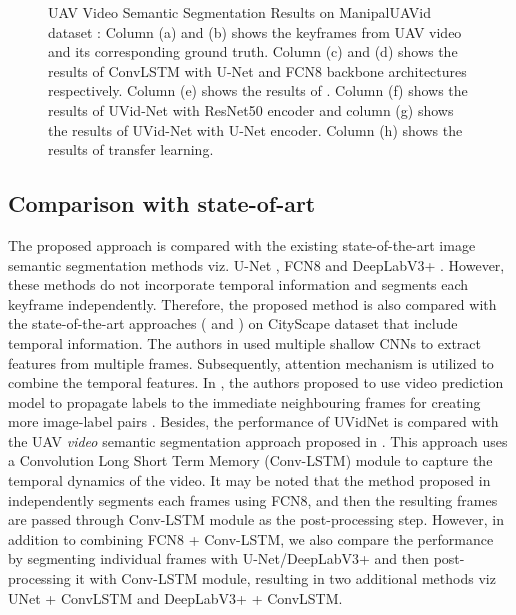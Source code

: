 \documentclass[journal]{IEEEtran}
\begin{document}
\begin{figure*}[!t]
\begin{tabular}{cccccccc}
	\end{tabular}
	\caption{ UAV Video Semantic Segmentation Results on ManipalUAVid dataset \cite{19}:  Column (a) and (b) shows the keyframes from UAV video and its corresponding ground truth. Column (c) and (d) shows the results of ConvLSTM with U-Net and FCN8 backbone architectures respectively. Column (e) shows the results of \cite{22}. Column (f) shows the results of UVid-Net with ResNet50 encoder and column (g) shows the results of UVid-Net with U-Net encoder. Column (h) shows the results of transfer learning.}
	\label{fig:SOTA}
	
\end{figure*}


\subsection {Comparison with state-of-art}
\label{Sec:SOTAComp}

\par The proposed approach is compared with the existing state-of-the-art image semantic segmentation methods viz. U-Net \cite{2},  FCN8 \cite{4} and DeepLabV3+ \cite{33}. However, these methods do not incorporate temporal information and segments each keyframe independently. Therefore, the proposed method is also compared with the state-of-the-art approaches (\cite{22} and \cite{hu2020temporally}) on CityScape dataset that include temporal information. The authors in \cite{hu2020temporally} used multiple shallow CNNs to extract features from multiple frames. Subsequently, attention mechanism is utilized to combine the temporal features. In \cite{22}, the authors proposed to use video prediction model to propagate labels to the immediate neighbouring frames for creating more image-label pairs \cite{22}.  Besides, the performance of UVidNet is compared with the UAV \textit{video} semantic segmentation approach proposed in \cite{wang2019deep}. This approach uses a Convolution Long Short Term Memory (Conv-LSTM) module to capture the temporal dynamics of the video. It may be noted that the method proposed in  \cite{wang2019deep} independently segments each frames using FCN8, and then the resulting frames are passed through Conv-LSTM module as the post-processing step. However, in addition to combining FCN8 + Conv-LSTM, we also compare the performance by segmenting individual frames with U-Net/DeepLabV3+ and then post-processing it with Conv-LSTM module, resulting in two additional methods viz UNet + ConvLSTM and DeepLabV3+ + ConvLSTM. 
\end{document}
